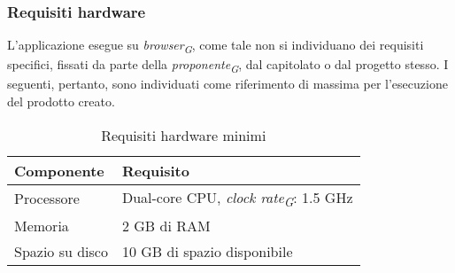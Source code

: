 \subsubsection{Requisiti hardware}
L’applicazione esegue su \textit{browser}\textsubscript{\textit{G}}, come tale non si individuano dei requisiti specifici, fissati da parte
della \textit{proponente}\textsubscript{\textit{G}}, dal capitolato o dal progetto stesso. I seguenti, pertanto, sono individuati come
riferimento di massima per l’esecuzione del prodotto creato.   
\begin{table}[H]
    \centering
    \begin{tabular}{ll}
        \toprule
        \textbf{Componente} & \textbf{Requisito} \\
        \midrule
        Processore & Dual-core CPU, \textit{clock rate}\textsubscript{\textit{G}}: 1.5 GHz \\
        Memoria & 2 GB di RAM \\
        Spazio su disco & 10 GB di spazio disponibile\\
        \bottomrule
    \end{tabular}
    \caption{Requisiti hardware minimi}
\end{table} 